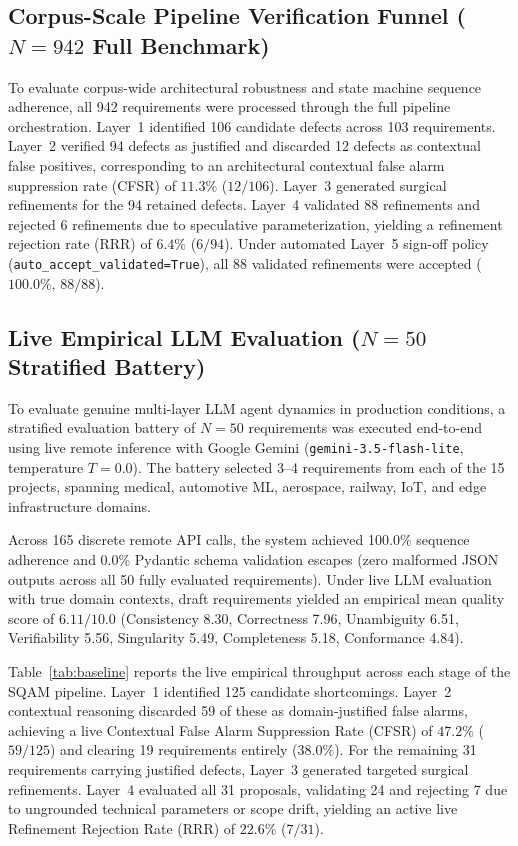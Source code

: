 \documentclass[journal]{IEEEtran}
\begin{document}
\subsection{Corpus-Scale Pipeline Verification Funnel ($N=942$ Full Benchmark)}
\label{sec:funnel-results}

To evaluate corpus-wide architectural robustness and state machine sequence adherence, all 942 requirements were processed through the full pipeline orchestration. Layer~1 identified 106 candidate defects across 103 requirements. Layer~2 verified 94 defects as justified and discarded 12 defects as contextual false positives, corresponding to an architectural contextual false alarm suppression rate (CFSR) of $11.3\%$ ($12/106$). Layer~3 generated surgical refinements for the 94 retained defects. Layer~4 validated 88 refinements and rejected 6 refinements due to speculative parameterization, yielding a refinement rejection rate (RRR) of $6.4\%$ ($6/94$). Under automated Layer~5 sign-off policy (\texttt{auto\_accept\_validated=True}), all 88 validated refinements were accepted ($100.0\%$, $88/88$).

\subsection{Live Empirical LLM Evaluation ($N=50$ Stratified Battery)}
\label{sec:baseline-results}

To evaluate genuine multi-layer LLM agent dynamics in production conditions, a stratified evaluation battery of $N=50$ requirements was executed end-to-end using live remote inference with Google Gemini (\texttt{gemini-3.5-flash-lite}, temperature $T = 0.0$). The battery selected 3--4 requirements from each of the 15 projects, spanning medical, automotive ML, aerospace, railway, IoT, and edge infrastructure domains.

Across 165 discrete remote API calls, the system achieved 100.0\% sequence adherence and 0.0\% Pydantic schema validation escapes (zero malformed JSON outputs across all 50 fully evaluated requirements). Under live LLM evaluation with true domain contexts, draft requirements yielded an empirical mean quality score of $6.11/10.0$ (Consistency 8.30, Correctness 7.96, Unambiguity 6.51, Verifiability 5.56, Singularity 5.49, Completeness 5.18, Conformance 4.84). 

Table~\ref{tab:baseline} reports the live empirical throughput across each stage of the SQAM pipeline. Layer~1 identified 125 candidate shortcomings. Layer~2 contextual reasoning discarded 59 of these as domain-justified false alarms, achieving a live Contextual False Alarm Suppression Rate (CFSR) of $47.2\%$ ($59/125$) and clearing 19 requirements entirely ($38.0\%$). For the remaining 31 requirements carrying justified defects, Layer~3 generated targeted surgical refinements. Layer~4 evaluated all 31 proposals, validating 24 and rejecting 7 due to ungrounded technical parameters or scope drift, yielding an active live Refinement Rejection Rate (RRR) of $22.6\%$ ($7/31$).
\end{document}
